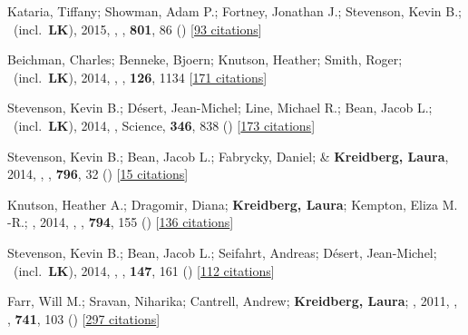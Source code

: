 \item[{\color{numcolor}\scriptsize7}] Kataria, Tiffany; Showman, Adam P.; Fortney, Jonathan J.; Stevenson, Kevin B.; \etal\ (incl.\ \textbf{LK}), 2015, , \apj, \textbf{801}, 86 () [\href{https://ui.adsabs.harvard.edu/abs/2015ApJ...801...86K}{93 citations}]

\item[{\color{numcolor}\scriptsize6}] Beichman, Charles; Benneke, Bjoern; Knutson, Heather; Smith, Roger; \etal\ (incl.\ \textbf{LK}), 2014, , \pasp, \textbf{126}, 1134 [\href{https://ui.adsabs.harvard.edu/abs/2014PASP..126.1134B}{171 citations}]

\item[{\color{numcolor}\scriptsize5}] Stevenson, Kevin B.; D{\'e}sert, Jean-Michel; Line, Michael R.; Bean, Jacob L.; \etal\ (incl.\ \textbf{LK}), 2014, , Science, \textbf{346}, 838 () [\href{https://ui.adsabs.harvard.edu/abs/2014Sci...346..838S}{173 citations}]

\item[{\color{numcolor}\scriptsize4}] Stevenson, Kevin B.; Bean, Jacob L.; Fabrycky, Daniel; \& \textbf{Kreidberg, Laura}, 2014, , \apj, \textbf{796}, 32 () [\href{https://ui.adsabs.harvard.edu/abs/2014ApJ...796...32S}{15 citations}]

\item[{\color{numcolor}\scriptsize3}] Knutson, Heather A.; Dragomir, Diana; \textbf{Kreidberg, Laura}; Kempton, Eliza M. -R.; \etal, 2014, , \apj, \textbf{794}, 155 () [\href{https://ui.adsabs.harvard.edu/abs/2014ApJ...794..155K}{136 citations}]

\item[{\color{numcolor}\scriptsize2}] Stevenson, Kevin B.; Bean, Jacob L.; Seifahrt, Andreas; D{\'e}sert, Jean-Michel; \etal\ (incl.\ \textbf{LK}), 2014, , \aj, \textbf{147}, 161 () [\href{https://ui.adsabs.harvard.edu/abs/2014AJ....147..161S}{112 citations}]

\item[{\color{numcolor}\scriptsize1}] Farr, Will M.; Sravan, Niharika; Cantrell, Andrew; \textbf{Kreidberg, Laura}; \etal, 2011, , \apj, \textbf{741}, 103 () [\href{https://ui.adsabs.harvard.edu/abs/2011ApJ...741..103F}{297 citations}]